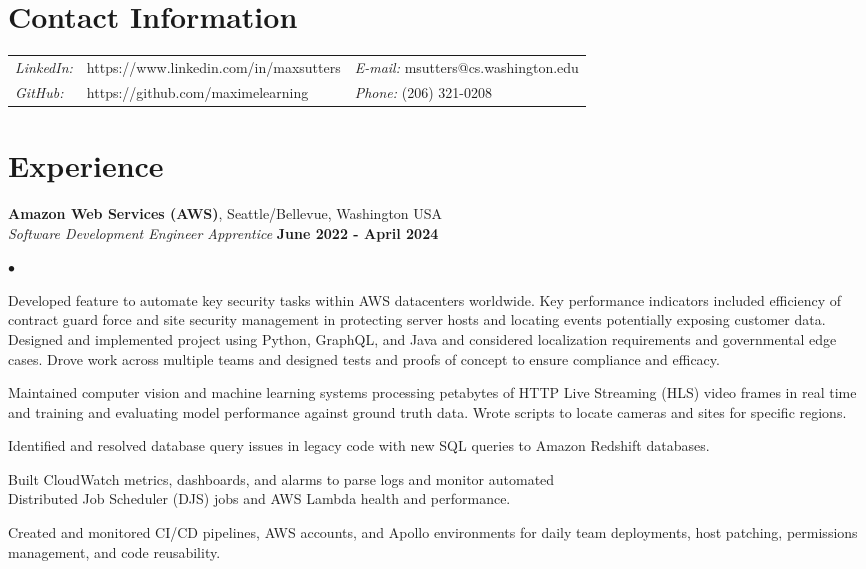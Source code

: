 \documentclass[margin,line]{res}
\newenvironment{list2}{
  \begin{list}{$\bullet$}{%
      \setlength{\itemsep}{0in}
      \setlength{\parsep}{0in} \setlength{\parskip}{0in}
      \setlength{\topsep}{0in} \setlength{\partopsep}{0in} 
      \setlength{\leftmargin}{0.2in}}}{\end{list}}
\begin{document}
\thispagestyle{empty}


\begin{resume}
\section{\sc Contact Information}
\vspace{.05in}
\begin{tabular}{@{}p{0.5in}p{2.5in}p{3in}}
{\it LinkedIn:} & https://www.linkedin.com/in/maxsutters & {\it E-mail:}  msutters@cs.washington.edu \\   
{\it GitHub:} & https://github.com/maximelearning & {\it Phone:} (206) 321-0208 \\
\end{tabular}

\section{\sc Experience}

{\bf Amazon Web Services (AWS)}, Seattle/Bellevue, Washington USA \\
{\em Software Development Engineer Apprentice} \hfill {\bf June 2022 - April 2024} \\
\begin{list2}
\item Developed feature to automate key security tasks within AWS datacenters worldwide. Key performance indicators included efficiency of contract guard force and site security management in protecting server hosts and locating events potentially exposing customer data. Designed and implemented project using Python, GraphQL, and Java and considered localization requirements and governmental edge cases. Drove work across multiple teams and designed tests and proofs of concept to ensure compliance and efficacy.
\item Maintained computer vision and machine learning systems processing petabytes of HTTP Live Streaming (HLS) video frames in real time and training and evaluating model performance against ground truth data. Wrote scripts to locate cameras and sites for specific regions.
\item Identified and resolved database query issues in legacy code with new SQL queries to Amazon Redshift databases.
\item Built CloudWatch metrics, dashboards, and alarms to parse logs and monitor automated \\ Distributed Job Scheduler (DJS) jobs and AWS Lambda health and performance.
\item Created and monitored CI/CD pipelines, AWS accounts, and Apollo environments for daily team deployments, host patching, permissions management, and code reusability.
\end{list2}


\end{resume}
\end{document}
